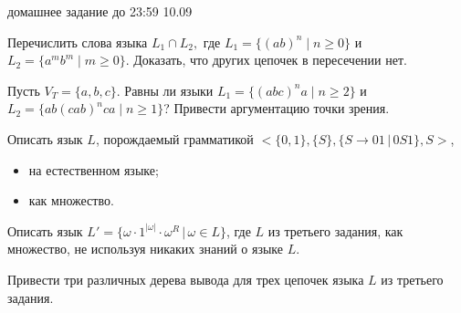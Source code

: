 \documentclass[12pt]{article}
\begin{document}

{\Large домашнее задание до 23:59 10.09}
\bigskip

\enumerate
{
  \item
  {
    Перечислить слова языка $L_1 \cap L_2,$ где $L_1 = \{ (ab)^n \mid n \geq 0 \}$ и $L_2 = \{ a^m b^m \mid m \geq 0 \}$. Доказать, что других цепочек в пересечении нет. 
  }
  \item
  {
    Пусть $V_T = \{a,b,c\}$. Равны ли языки $L_1 = \{ (abc)^n a \mid n \geq 2 \}$ и $L_2 = \{ ab (cab)^n ca \mid n \geq 1 \}$? Привести аргументацию точки зрения. 
  }
  \item 
  { Описать язык $L$, порождаемый грамматикой $<\{0, 1\}, \{S\}, \{S \to 0 1 \, | \, 0 S 1\}, S>$, 
    \begin{itemize}
        \item на естественном языке;
        \item как множество.
    \end{itemize}

  }

  \item
  {
    Описать язык $L' = \{ \omega \cdot 1^{|\omega|} \cdot \omega^R \, | \, \omega \in L \}$, где $L$ из третьего задания, как множество, не используя никаких знаний о языке $L$.
  }
  
  \item {Привести три различных дерева вывода для трех цепочек языка $L$ из третьего задания.}
}
\end{document}
